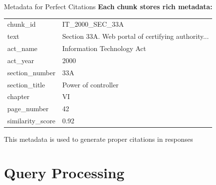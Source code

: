 \documentclass[11pt,aspectratio=16:9]{beamer}
\begin{document}
\begin{frame}{Metadata for Perfect Citations}
    \textbf{Each chunk stores rich metadata:}
    
    \vspace{0.5cm}
    
    \begin{center}
        \small
        \begin{tabular}{ll}
            chunk\_id & IT\_2000\_SEC\_33A \\
            text & Section 33A. Web portal of certifying authority... \\
            act\_name & Information Technology Act \\
            act\_year & 2000 \\
            section\_number & 33A \\
            section\_title & Power of controller \\
            chapter & VI \\
            page\_number & 42 \\
            similarity\_score & 0.92 \\
        \end{tabular}
    \end{center}
    
    \vspace{0.5cm}
    {\small This metadata is used to generate proper citations in responses}
\end{frame}

\section{Query Processing}
\end{document}
